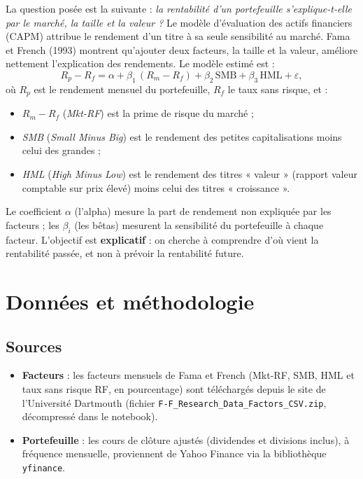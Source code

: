 \documentclass[11pt,a4paper]{article}
\newcommand{\Rp}{R_p}
\newcommand{\Rf}{R_f}
\begin{document}
La question posée est la suivante : \emph{la rentabilité d'un portefeuille s'explique-t-elle par le marché, la taille et la valeur ?} Le modèle d'évaluation des actifs financiers (CAPM) attribue le rendement d'un titre à sa seule sensibilité au marché. Fama et French (1993) montrent qu'ajouter deux facteurs, la taille et la valeur, améliore nettement l'explication des rendements. Le modèle estimé est :
\begin{equation}
\Rp - \Rf = \alpha + \beta_1\,(R_m - \Rf) + \beta_2\,\mathrm{SMB} + \beta_3\,\mathrm{HML} + \varepsilon,
\label{eq:ff3}
\end{equation}
où $\Rp$ est le rendement mensuel du portefeuille, $\Rf$ le taux sans risque, et :
\begin{itemize}
  \item $R_m-\Rf$ (\emph{Mkt-RF}) est la prime de risque du marché ;
  \item \emph{SMB} (\emph{Small Minus Big}) est le rendement des petites capitalisations moins celui des grandes ;
  \item \emph{HML} (\emph{High Minus Low}) est le rendement des titres « valeur » (rapport valeur comptable sur prix élevé) moins celui des titres « croissance ».
\end{itemize}
Le coefficient $\alpha$ (l'alpha) mesure la part de rendement non expliquée par les facteurs ; les $\beta_i$ (les bêtas) mesurent la sensibilité du portefeuille à chaque facteur. L'objectif est \textbf{explicatif} : on cherche à comprendre d'où vient la rentabilité passée, et non à prévoir la rentabilité future.

\section{Données et méthodologie}

\subsection{Sources}
\begin{itemize}
  \item \textbf{Facteurs} : les facteurs mensuels de Fama et French (Mkt-RF, SMB, HML et taux sans risque RF, en pourcentage) sont téléchargés depuis le site de l'Université Dartmouth (fichier \texttt{F-F\_Research\_Data\_Factors\_CSV.zip}, décompressé dans le notebook).
  \item \textbf{Portefeuille} : les cours de clôture ajustés (dividendes et divisions inclus), à fréquence mensuelle, proviennent de Yahoo Finance via la bibliothèque \texttt{yfinance}.
\end{itemize}
\end{document}
